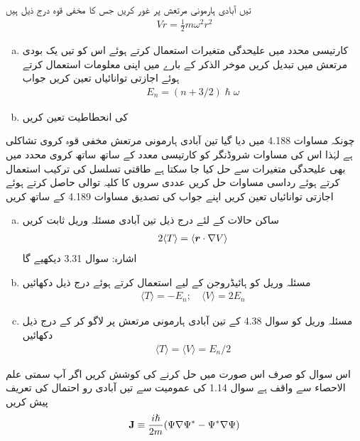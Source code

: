 تیں آبادی ہارمونی مرتعش پر غور کریں جس کا مخفی قوہ درج ذیل ہیں 
\begin{align}
V r = \frac{1}{2} m \omega^2 r^2
\end{align}
\begin{enumerate}[a.]
\item
کارتیسی محدد میں علیحدگی متغیرات استعمال کرتے ہوئے اس کو تیں یک بودی مرتعش میں تبدیل کریں موخر الذکر کے بارے میں اپنی معلومات استعمال کرتے ہوئے اجازتی توانائیاں تعین کریں جواب 
\begin{align}
E_n = (n + 3/2) \hslash \omega
\end{align}
\item
{} کی انحطاطيت  تعین کریں 
\end{enumerate}
چونکہ مساوات 4.188 میں دیا گیا تین آبادی ہارمونی مرتعش مخفی قوہ کروی تشاکلی ہے لہٰذا اس کی مساوات شروڈنگر کو کارتیسی معدد کے ساتھ ساتھ کروی محدد میں بھی علیحدگی  متغیرات سے حل کیا جا سکتا ہے طاقتی تسلسل کی ترکیب استعمال کرتے ہوئے رداسی مساوات حل کریں عددی سروں کا کلیہ توالی حاصل کرتے ہوئے اجازتی توانائیاں تعین کریں اپنے جواب کی تصدیق مساوات 4.189 کے ساتھ کریں 
\begin{enumerate}[a.]
\item
ساکن حالات کے لئے درج ذیل تین آبادی مسئلہ وریل ثابت کریں 
\begin{align}
2 \langle T \rangle = \langle {\ensuremath{{\boldsymbol{r}}}} \cdot \nabla V \rangle
\end{align}
اشارہ: سوال 3.31 دیکھیے گا 
\item
مسئلہ وریل کو ہائیڈروجن کے لیے استعمال کرتے ہوئے درج ذیل دکھائیں 
\begin{align}
\langle T \rangle = - E_n; \quad \langle V \rangle = 2 E_n
\end{align}
\item
مسئلہ وریل کو سوال 4.38 کے تین آبادی ہارمونی مرتعش پر لاگو کر کے درج ذیل دکھائیں 
\begin{align}
\langle T \rangle = \langle V \rangle = E_n /2
\end{align}
\end{enumerate}
اس سوال کو صرف اس صورت میں حل کرنے کی کوشش کریں اگر آپ سمتی علم الاحصاء سے واقف ہے سوال 1.14 کی عمومیت سے تیں آبادی رو احتمال کی تعریف پیش کریں 
\begin{align}
\operatorname{\mathbf{J}} \equiv \frac{i \hslash}{2 m} (\Psi \nabla \Psi^* - \Psi^* \nabla \Psi)
\end{align}
